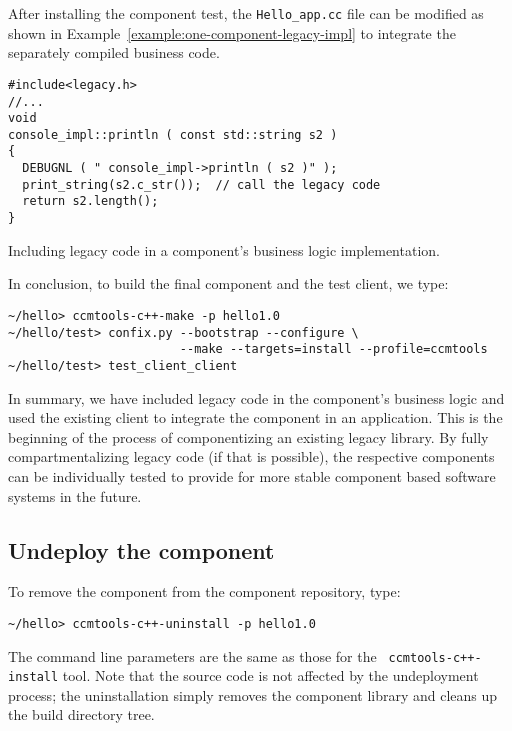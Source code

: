 After installing the component test, the {\tt Hello\_app.cc} file can be
modified as shown in Example~\ref{example:one-component-legacy-impl} to
integrate the separately compiled business code.

\begin{Example}
\begin{minifbox}
\begin{small}
\begin{verbatim}
#include<legacy.h>
//...
void
console_impl::println ( const std::string s2 )
{
  DEBUGNL ( " console_impl->println ( s2 )" );
  print_string(s2.c_str());  // call the legacy code
  return s2.length();
}
\end{verbatim}
\end{small}
\end{minifbox}
\caption{Including legacy code in a component's business logic implementation.}
\label{example:one-component-legacy-impl}
\end{Example}

In conclusion, to build the final component and the test client, we type:

\begin{small}
\begin{verbatim}
~/hello> ccmtools-c++-make -p hello1.0
~/hello/test> confix.py --bootstrap --configure \
                        --make --targets=install --profile=ccmtools
~/hello/test> test_client_client
\end{verbatim}
\end{small}

In summary, we have included legacy code in the component's business logic and
used the existing client to integrate the component in an application. This is
the beginning of the process of componentizing an existing legacy library. By
fully compartmentalizing legacy code (if that is possible), the respective
components can be individually tested to provide for more stable component based
software systems in the future.

\subsection{Undeploy the component}

To remove the component from the component repository, type:

\begin{small}
\begin{verbatim}
~/hello> ccmtools-c++-uninstall -p hello1.0
\end{verbatim}
\end{small}

The command line parameters are the same as those for the {\tt
ccmtools-c++-install} tool. Note that the source code is not affected by the
undeployment process; the uninstallation simply removes the component library
and cleans up the build directory tree.

